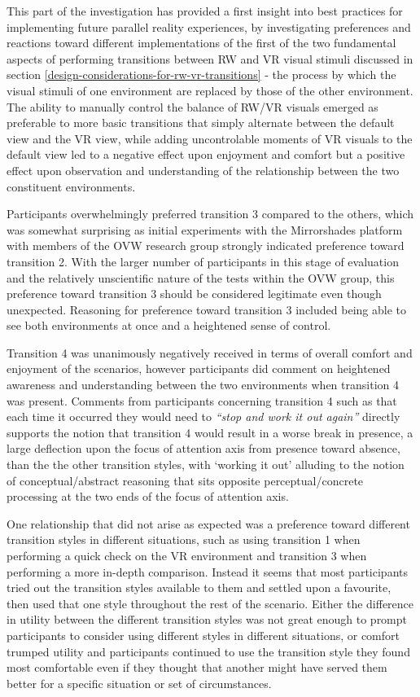 This part of the investigation has provided a first insight into best practices for implementing future parallel reality experiences, by investigating preferences and reactions toward different implementations of the first of the two fundamental aspects of performing transitions between RW and VR visual stimuli discussed in section \ref{design-considerations-for-rw-vr-transitions} - the process by which the visual stimuli of one environment are replaced by those of the other environment. The ability to manually control the balance of RW/VR visuals emerged as preferable to more basic transitions that simply alternate between the default view and the VR view, while adding uncontrolable moments of VR visuals to the default view led to a negative effect upon enjoyment and comfort but a positive effect upon observation and understanding of the relationship between the two constituent environments.

Participants overwhelmingly preferred transition 3 compared to the others, which was somewhat surprising as initial experiments with the Mirrorshades platform with members of the OVW research group strongly indicated preference toward transition 2. With the larger number of participants in this stage of evaluation and the relatively unscientific nature of the tests within the OVW group, this preference toward transition 3 should be considered legitimate even though unexpected. Reasoning for preference toward transition 3 included being able to see both environments at once and a heightened sense of control.

Transition 4 was unanimously negatively received in terms of overall comfort and enjoyment of the scenarios, however participants did comment on heightened awareness and understanding between the two environments when transition 4 was present. Comments from participants concerning transition 4 such as that each time it occurred they would need to \textit{``stop and work it out again''} directly supports the notion that transition 4 would result in a worse break in presence, a large deflection upon the focus of attention axis from presence toward absence, than the the other transition styles, with `working it out' alluding to the notion of conceptual/abstract reasoning that sits opposite perceptual/concrete processing at the two ends of the focus of attention axis.

One relationship that did not arise as expected was a preference toward different transition styles in different situations, such as using transition 1 when performing a quick check on the VR environment and transition 3 when performing a more in-depth comparison. Instead it seems that most participants tried out the transition styles available to them and settled upon a favourite, then used that one style throughout the rest of the scenario. Either the difference in utility between the different transition styles was not great enough to prompt participants to consider using different styles in different situations, or comfort trumped utility and participants continued to use the transition style they found most comfortable even if they thought that another might have served them better for a specific situation or set of circumstances.

